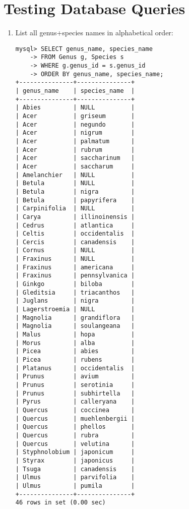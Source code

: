 \documentclass{article}
\begin{document}
\section{Testing Database Queries}
\begin{enumerate}
    \item List all genus+species names in alphabetical order: \begin{verbatim}
mysql> SELECT genus_name, species_name
    -> FROM Genus g, Species s
    -> WHERE g.genus_id = s.genus_id
    -> ORDER BY genus_name, species_name; 
+---------------+---------------+
| genus_name    | species_name  |
+---------------+---------------+
| Abies         | NULL          |
| Acer          | griseum       |
| Acer          | negundo       |
| Acer          | nigrum        |
| Acer          | palmatum      |
| Acer          | rubrum        |
| Acer          | saccharinum   |
| Acer          | saccharum     |
| Amelanchier   | NULL          |
| Betula        | NULL          |
| Betula        | nigra         |
| Betula        | papyrifera    |
| Carpinifolia  | NULL          |
| Carya         | illinoinensis |
| Cedrus        | atlantica     |
| Celtis        | occidentalis  |
| Cercis        | canadensis    |
| Cornus        | NULL          |
| Fraxinus      | NULL          |
| Fraxinus      | americana     |
| Fraxinus      | pennsylvanica |
| Ginkgo        | biloba        |
| Gleditsia     | triacanthos   |
| Juglans       | nigra         |
| Lagerstroemia | NULL          |
| Magnolia      | grandiflora   |
| Magnolia      | soulangeana   |
| Malus         | hopa          |
| Morus         | alba          |
| Picea         | abies         |
| Picea         | rubens        |
| Platanus      | occidentalis  |
| Prunus        | avium         |
| Prunus        | serotinia     |
| Prunus        | subhirtella   |
| Pyrus         | calleryana    |
| Quercus       | coccinea      |
| Quercus       | muehlenbergii |
| Quercus       | phellos       |
| Quercus       | rubra         |
| Quercus       | velutina      |
| Styphnolobium | japonicum     |
| Styrax        | japonicus     |
| Tsuga         | canadensis    |
| Ulmus         | parvifolia    |
| Ulmus         | pumila        |
+---------------+---------------+
46 rows in set (0.00 sec)


\end{verbatim}
\end{enumerate}
\end{document}
